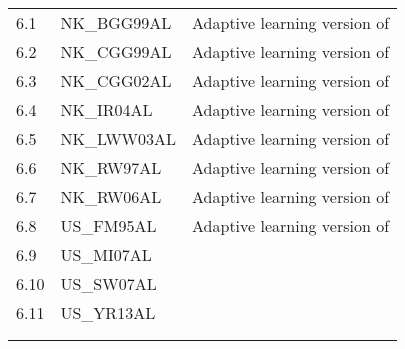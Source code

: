 \documentclass[11pt,a4paper]{article}
\begin{document}
\begin{table}[H]
\begin{tabularx}{\textwidth}{lll}
			
			6.1\footnotemark[1] &  NK\_BGG99AL & Adaptive learning version of \cite{BernankeGertlerGilchrist1999}\\%
			6.2\footnotemark[1] &  NK\_CGG99AL & Adaptive learning version of \cite{ClaridaGaliGertler1999}\\%
			6.3\footnotemark[1] &  NK\_CGG02AL & Adaptive learning version of \cite{ClaridaGaliGertler2002}\\%
			6.4\footnotemark[1] &  NK\_IR04AL & Adaptive learning version of  \cite{Ireland2004}\\%
			6.5\footnotemark[1] & NK\_LWW03AL & Adaptive learning version of  \cite{LevinWielandWilliams2003}\\%
			6.6\footnotemark[1] & NK\_RW97AL & Adaptive learning version of \cite{RotembergWoodford1997}\\%
			6.7\footnotemark[1] & NK\_RW06AL & Adaptive learning version of \cite{RavennaWalsh2006}\\%
			6.8\footnotemark[1] & US\_FM95AL & Adaptive learning version of  \cite{FuhrerMoore1995}\\%
			6.9\footnotemark[1] &  US\_MI07AL & \cite{Milani2007}\\%
			6.10\footnotemark[1] & US\_SW07AL & \cite{Slobodyan2012} \\
			6.11\footnotemark[1] & US\_YR13AL & \cite{rychalovska2016}\\%
			
			
			&&\\
			
			
			
			\hline \hline
			\vspace{-0.5cm}
		\end{tabularx} 
	\end{table}
	
\end{document}
